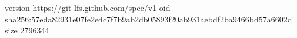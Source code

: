 version https://git-lfs.github.com/spec/v1
oid sha256:57eda82931e07fe2edc7f7b9ab2db05893f20ab931aebdf2ba9466bd57a6602d
size 2796344
